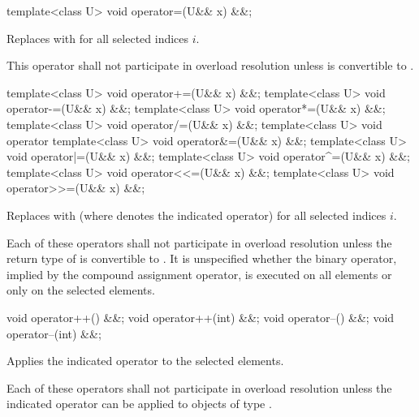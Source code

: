 \begin{itemdecl}
template<class U> void operator=(U&& x) &&;
\end{itemdecl}

\begin{itemdescr}
  \pnum\effects
  Replaces  with  for all selected indices $i$.

  \pnum\remarks
  This operator shall not participate in overload resolution unless  is convertible to .
\end{itemdescr}

\begin{itemdecl}
template<class U> void operator+=(U&& x) &&;
template<class U> void operator-=(U&& x) &&;
template<class U> void operator*=(U&& x) &&;
template<class U> void operator/=(U&& x) &&;
template<class U> void operator%
template<class U> void operator&=(U&& x) &&;
template<class U> void operator|=(U&& x) &&;
template<class U> void operator^=(U&& x) &&;
template<class U> void operator<<=(U&& x) &&;
template<class U> void operator>>=(U&& x) &&;
\end{itemdecl}

\begin{itemdescr}
  \pnum\effects
  Replaces  with  (where  denotes the indicated operator) for all selected indices $i$.

  \pnum\remarks
  Each of these operators shall not participate in overload resolution unless the return type of  is convertible to . It is unspecified whether the binary operator, implied by the compound assignment operator, is executed on all elements or only on the selected elements.
\end{itemdescr}

\begin{itemdecl}
void operator++() &&;
void operator++(int) &&;
void operator--() &&;
void operator--(int) &&;
\end{itemdecl}

\begin{itemdescr}
  \pnum\effects
  Applies the indicated operator to the selected elements.

  \pnum\remarks
  Each of these operators shall not participate in overload resolution unless the indicated operator can be applied to objects of type .
\end{itemdescr}

